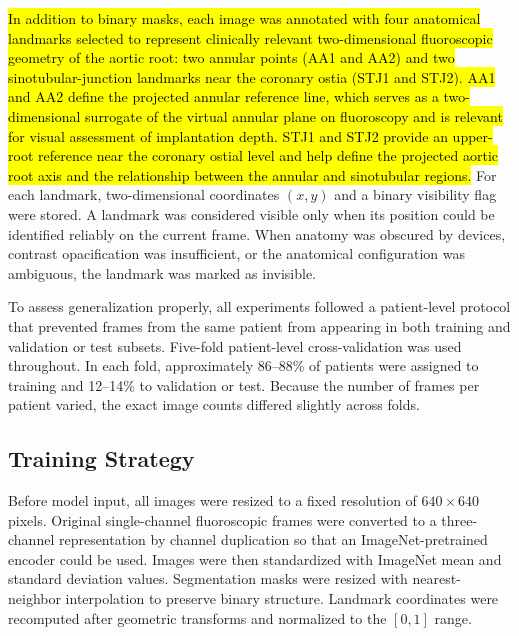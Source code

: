 \documentclass[utf8]{FrontiersinHarvard}
\begin{document}
\hl{ In addition to binary masks, each image was annotated with four anatomical landmarks selected to represent clinically relevant 
two-dimensional fluoroscopic geometry of the aortic root: two annular points (AA1 and AA2) and two sinotubular-junction landmarks
 near the coronary ostia (STJ1 and STJ2). AA1 and AA2 define the projected annular reference line, which serves as a two-dimensional 
 surrogate of the virtual annular plane on fluoroscopy and is relevant for visual assessment of implantation depth. STJ1 and STJ2 
 provide an upper-root reference near the coronary ostial level and help define the projected aortic root axis and the relationship 
 between the annular and sinotubular regions.} For each landmark, two-dimensional coordinates $(x,y)$ and a 
binary visibility flag were stored. A landmark was considered visible only when its position could be identified reliably on the current frame. 
When anatomy was obscured by devices, contrast opacification was insufficient, or the anatomical configuration was ambiguous, the landmark was marked as invisible.

To assess generalization properly, all experiments followed a patient-level protocol that prevented frames from the same patient from appearing 
in both training and validation or test subsets. Five-fold patient-level cross-validation was used throughout. In each fold, 
approximately 86--88\% of patients were assigned to training and 12--14\% to validation or test. Because the number of frames per patient varied, 
the exact image counts differed slightly across folds.

\subsection{Training Strategy}

Before model input, all images were resized to a fixed resolution of $640 \times 640$ pixels. Original single-channel fluoroscopic frames were 
converted to a three-channel representation by channel duplication so that an ImageNet-pretrained encoder could be used. Images were then 
standardized with ImageNet mean and standard deviation values. Segmentation masks were resized with nearest-neighbor interpolation to preserve 
binary structure. Landmark coordinates were recomputed after geometric transforms and normalized to the $[0,1]$ range.
\end{document}
